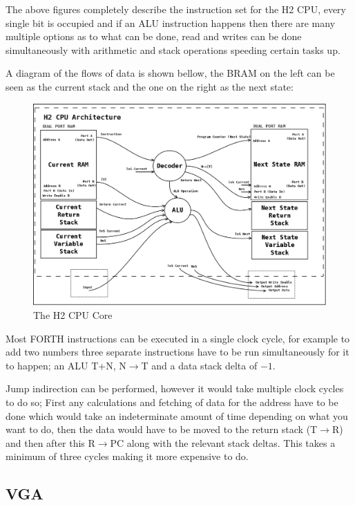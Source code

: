 \documentclass	[a4paper, 10pt]	{article}
\begin{document}
      The above figures completely describe the instruction set for the H2 CPU, every single bit is occupied
      and if an ALU instruction happens then there are many multiple options as to what can be done, read and
      writes can be done simultaneously with arithmetic and stack operations speeding certain tasks up.

      A diagram of the flows of data is shown bellow, the BRAM on the left can be seen as the current stack
      and the one on the right as the next state:

      \begin{figure}[ht]
        \centering
        \includegraphics[width=1.1\textwidth]{pic/h2.png}
        \caption{The H2 CPU Core}
        \label{fig:H2 CPU Core}
      \end{figure}
      \FloatBarrier

      Most FORTH instructions can be executed in a single clock cycle, for example to add two numbers
      three separate instructions have to be run simultaneously for it to happen; an ALU T+N, N$\to$T and
      a data stack delta of $-1$.

      Jump indirection can be performed, however it would take multiple clock cycles to do so; First any
      calculations and fetching of data for the address have to be done which would take an indeterminate
      amount of time depending on what you want to do, then the data would have to be moved to the return
      stack (T$\to$R) and then after this R$\to$PC along with the relevant stack deltas. This takes a
      minimum of three cycles making it more expensive to do.

    \subsection{VGA}
\end{document}
